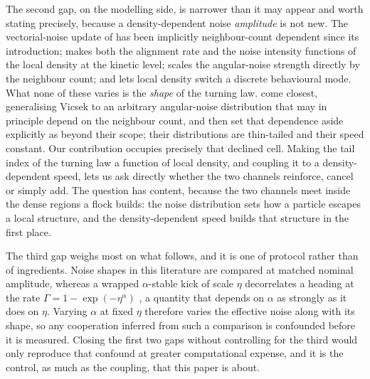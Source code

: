 \documentclass[11pt,a4paper]{article}
\begin{document}
The second gap, on the modelling side, is narrower than it may
appear and worth stating precisely, because a
density-dependent noise \emph{amplitude} is not new. The
vectorial-noise update of \citet{Gregoire2004} has been
implicitly neighbour-count dependent since its introduction;
\citet{Frouvelle2012} makes both the alignment rate and the noise
intensity functions of the local density at the kinetic level;
\citet{Haghsheno2024} scales the angular-noise strength directly
by the neighbour count; and \citet{ChenMa2016} lets local density
switch a discrete behavioural mode. What none of these varies is
the \emph{shape} of the turning law. \citet{Clusella2021} come
closest, generalising Vicsek to an arbitrary angular-noise
distribution that may in principle depend on the neighbour count,
and then set that dependence aside explicitly as beyond their
scope; their distributions are thin-tailed and their speed
constant. Our contribution occupies precisely that declined cell.
Making the tail index of the turning law a function of local
density, and coupling it to a density-dependent speed, lets us
ask directly whether the two channels reinforce, cancel or simply
add. The question has content, because the
two channels meet inside the dense regions a flock builds: the
noise distribution sets how a particle escapes a local structure,
and the density-dependent speed builds that structure in the
first place.

The third gap weighs most on what follows, and it is one of
protocol rather than of ingredients. Noise shapes in this
literature are compared at matched nominal amplitude, whereas a
wrapped $\alpha$-stable kick of scale $\eta$ decorrelates a
heading at the rate $\Gamma = 1 - \exp(-\eta^{\alpha})$
\citep{Gatto2003, Pewsey2008, Mardia2000}, a quantity that
depends on $\alpha$ as strongly as it does on $\eta$. Varying
$\alpha$ at fixed $\eta$ therefore varies the effective noise
along with its shape, so any cooperation inferred from such a
comparison is confounded before it is measured. Closing the first
two gaps without controlling for the third would only reproduce
that confound at greater computational expense, and it is the
control, as much as the coupling, that this paper is about.
\end{document}
